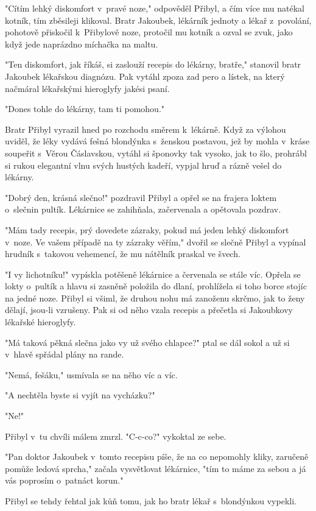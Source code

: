 \documentclass[a5paper, 11pt, twoside]{article}
\begin{document}
"Cítím lehký diskomfort v~pravé noze," odpověděl Přibyl, a čím více mu
natékal kotník, tím zběsileji klikoval. Bratr Jakoubek, lékárník jednoty
a lékař z~povolání, pohotově přiskočil k~Přibylově noze, protočil mu
kotník a ozval se zvuk, jako když jede naprázdno míchačka na maltu.

"Ten diskomfort, jak říkáš, si zaslouží recepis do lékárny, bratře,"
stanovil bratr Jakoubek lékařskou diagnózu. Pak vytáhl zpoza zad pero a
lístek, na který načmáral lékařskými hieroglyfy jakési psaní.

"Dones tohle do lékárny, tam ti pomohou."

Bratr Přibyl vyrazil hned po rozchodu směrem k~lékárně. Když za výlohou
uviděl, že léky vydává fešná blondýnka s~ženskou postavou, jež by mohla
v~kráse soupeřit s~Věrou Čáslavskou, vytáhl si šponovky tak vysoko, jak
to šlo, prohrábl si rukou elegantní vlnu svých hustých kadeří, vypjal
hruď a rázně vešel do lékárny.

"Dobrý den, krásná slečno!" pozdravil Přibyl a opřel se na frajera
loktem o~slečnin pultík. Lékárnice se zahihňala, začervenala a opětovala
pozdrav.

"Mám tady recepis, prý dovedete zázraky, pokud má jeden lehký diskomfort
v~noze. Ve vašem případě na ty zázraky věřím," dvořil se slečně Přibyl
a vypínal hrudník s~takovou vehemencí, že mu nátělník praskal ve švech.

"I vy lichotníku!" vypískla potěšeně lékárnice a červenala se stále
víc. Opřela se lokty o~pultík a hlavu si zasněně položila do dlaní,
prohlížela si toho borce stojíc na jedné noze. Přibyl si všiml, že
druhou nohu má zanoženu skrčmo, jak to ženy dělají, jsou-li vzrušeny.
Pak si od něho vzala recepis a přečetla si Jakoubkovy lékařské
hieroglyfy.

"Má taková pěkná slečna jako vy už svého chlapce?" ptal se dál sokol
a už si v~hlavě spřádal plány na rande.

"Nemá, fešáku," usmívala se na něho víc a víc.

"A nechtěla byste si vyjít na vycházku?"

"Ne!"

Přibyl v~tu chvíli málem zmrzl. "C-c-co?" vykoktal ze sebe.

"Pan doktor Jakoubek v~tomto recepisu píše, že na co nepomohly kliky,
zaručeně pomůže ledová sprcha," začala vysvětlovat lékárnice, "tím to
máme za sebou a já vás poprosím o~patnáct korun."

Přibyl se tehdy řehtal jak kůň tomu, jak ho bratr lékař s~blondýnkou
vypekli.
\end{document}
